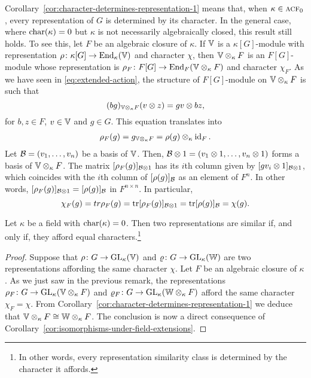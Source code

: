 \begin{rem}
    Corollary~\ref{cor:character-determines-representation-1} means that, when $\kappa\in\operatorname{\textnormal{\textsc{acf}}}_0$, every representation of $G$ is determined by its character. In the general case, where $\operatorname{char}(\kappa)=0$ but $\kappa$ is not necessarily algebraically closed, this result still holds. To see this, let $F$ be an algebraic closure of $\kappa$. If $\mathbb V$ is a $\kappa[G]$-module with representation $\rho\colon\kappa[G]\to{\operatorname{End}}_\kappa(\mathbb V)$ and character $\chi$, then $\mathbb V\otimes_\kappa F$ is an $F[G]$-module whose representation is $\rho_F\colon F[G]\to{\operatorname{End}}_F(\mathbb V\otimes_\kappa F)$ and character $\chi_F$. As we have seen in \eqref{eq:extended-action}, the structure of $F[G]$-module on $\mathbb V\otimes_\kappa F$ is such that
    $$
        (bg)_{\mathbb V\otimes_\kappa F}(v\otimes z) = gv\otimes bz,
    $$
    for $b,z\in F$, $v\in\mathbb V$ and $g\in G$. This equation translates into
    \begin{align*}
        \rho_F(g) = g_{\mathbb V\otimes_\kappa F}
            =\rho(g)\otimes_\kappa\operatorname{id}_F.
    \end{align*}
    Let $\mathcal B = (v_1, \dots, v_n)$ be a basis of $\mathbb V$. Then, $\mathcal B \otimes 1 = (v_1 \otimes 1, \dots, v_n \otimes 1)$ forms a basis of $\mathbb V \otimes_\kappa F$. The matrix $[\rho_F(g)]_{\mathcal B \otimes 1}$ has its $i$th column given by $[gv_i \otimes 1]_{\mathcal B \otimes 1}$, which coincides with the $i$th column of $[\rho(g)]_{\mathcal B}$ as an element of $F^n$. In other words, $[\rho_F(g)]_{\mathcal B\otimes1}=[\rho(g)]_{\mathcal B}$ in $F^{n\times n}$. In particular,
    $$
        \chi_F(g)=tr\rho_F(g)
            =\operatorname{tr}[\rho_F(g)]_{\mathcal B\otimes1}
            =\operatorname{tr}[\rho(g)]_{\mathcal B}
            =\chi(g).
    $$
    
\end{rem}

\begin{cor}\label{cor:character-determines-representation-2}
    Let\/ $\kappa$ be a field with $\operatorname{char}(\kappa)=0$. Then two\/ representations are similar if, and only if, they afford equal characters.\footnote{In other words, every representation similarity class is determined by the character it affords.}
\end{cor}

\begin{proof}
    Suppose that $\rho\colon G\to{\rm GL}_\kappa(\mathbb V)$ and $\varrho\colon G\to{\rm GL}_\kappa(\mathbb W)$ are two representations affording the same character $\chi$. Let $F$ be an algebraic closure of $\kappa$. As we just saw in the previous remark, the representations $\rho_F\colon G\to{\rm GL}_\kappa(\mathbb V\otimes_\kappa F)$ and $\varrho_F\colon G\to{\rm GL}_\kappa(\mathbb W\otimes_\kappa F)$ afford the same character $\chi_F=\chi$. From Corollary~\ref{cor:character-determines-representation-1} we deduce that $\mathbb V\otimes_\kappa F\cong\mathbb W\otimes_\kappa F$. The conclusion is now a direct consequence of Corollary~\ref{cor:isomorphisms-under-field-extensions}.
\end{proof}

